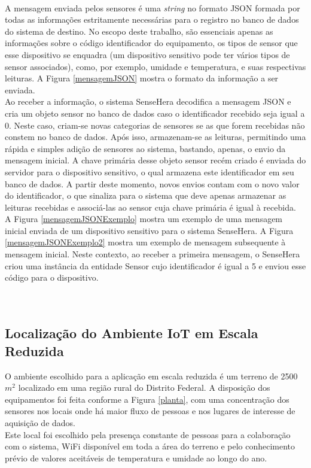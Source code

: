 \\\null \quad A mensagem enviada pelos sensores é uma \textit{string} no formato JSON formada por todas as informações estritamente necessárias para o registro no banco de dados do sistema de destino.
No escopo deste trabalho, são essenciais apenas as informações sobre o código identificador do equipamento, os tipos de sensor que esse dispositivo se enquadra (um dispositivo sensitivo pode ter vários tipos de sensor associados), como, por exemplo, umidade e temperatura, e suas respectivas leituras. A Figura \ref{mensagemJSON} mostra o formato da informação a ser enviada.
\\\null \quad Ao receber a informação, o sistema SenseHera decodifica a mensagem JSON e cria um objeto sensor no banco de dados caso o identificador recebido seja igual a 0. Neste caso, criam-se novas categorias de sensores se as que forem recebidas não constem no banco de dados. Após isso, armazenam-se as leituras, permitindo uma rápida e simples adição de sensores ao sistema, bastando, apenas, o envio da mensagem inicial. A chave primária desse objeto sensor recém criado é enviada do servidor para o dispositivo sensitivo, o qual armazena este identificador em seu banco de dados. A partir deste momento, novos envios contam com o novo valor do identificador, o que sinaliza para o sistema que deve apenas armazenar as leituras recebidas e associá-las ao sensor cuja chave primária é igual à recebida.
\\\null\quad A Figura \ref{mensagemJSONExemplo} mostra um exemplo de uma mensagem inicial enviada de um dispositivo sensitivo para o sistema SenseHera. A Figura \ref{mensagemJSONExemplo2} mostra um exemplo de mensagem subsequente à mensagem inicial. Neste contexto, ao receber a primeira mensagem, o SenseHera criou uma instância da entidade Sensor cujo identificador é igual a 5 e enviou esse código para o dispositivo.
\\\\\\
\pagebreak
{}
\subsection{Localização do Ambiente IoT em Escala Reduzida}
\quad O ambiente escolhido para a aplicação em escala reduzida é um terreno de 2500 $m^2$ localizado em uma
região rural do Distrito Federal. A disposição dos equipamentos foi feita conforme a Figura \ref{planta},
com uma concentração dos sensores nos locais onde há maior fluxo de pessoas e nos lugares de interesse de
aquisição de dados.
\\\null \quad Este local foi escolhido pela presença constante de pessoas para a colaboração com o sistema, WiFi disponível em toda a área do terreno e pelo conhecimento prévio de valores aceitáveis de temperatura
  e umidade ao longo do ano.
\newpage

